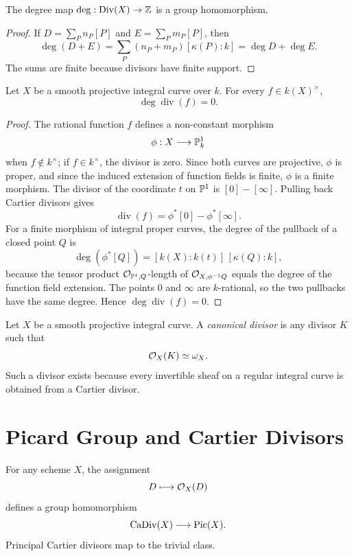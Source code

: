 \begin{proposition}
The degree map \(\deg:\operatorname{Div}(X)\to\mathbb{Z}\) is a group homomorphism.
\end{proposition}

\begin{proof}
If \(D=\sum_P n_P[P]\) and \(E=\sum_P m_P[P]\), then
\[
    \deg(D+E)
    =
    \sum_P (n_P+m_P)[\kappa(P):k]
    =
    \deg D+\deg E.
\]
The sums are finite because divisors have finite support.
\end{proof}

\begin{theorem}
Let \(X\) be a smooth projective integral curve over \(k\).  For every
\(f\in k(X)^\times\),
\[
    \deg\operatorname{div}(f)=0.
\]
\end{theorem}

\begin{proof}
The rational function \(f\) defines a non-constant morphism
\[
    \phi:X\longrightarrow \mathbb{P}^1_k
\]
when \(f\notin k^\times\); if \(f\in k^\times\), the divisor is zero.  Since
both curves are projective, \(\phi\) is proper, and since the induced extension
of function fields is finite, \(\phi\) is a finite morphism.  The divisor of
the coordinate \(t\) on \(\mathbb{P}^1\) is \([0]-[\infty]\).  Pulling back Cartier
divisors gives
\[
    \operatorname{div}(f)=\phi^*[0]-\phi^*[\infty].
\]
For a finite morphism of integral proper curves, the degree of the pullback of
a closed point \(Q\) is
\[
    \deg(\phi^*[Q])
    =
    [k(X):k(t)]\,[\kappa(Q):k],
\]
because the tensor product
\(\mathcal{O}_{\mathbb{P}^1,Q}\)-length of \(\mathcal{O}_{X,\phi^{-1}Q}\) equals the degree of the
function field extension.  The points \(0\) and \(\infty\) are \(k\)-rational,
so the two pullbacks have the same degree.  Hence
\(\deg\operatorname{div}(f)=0\).
\end{proof}

\begin{definition}
Let \(X\) be a smooth projective integral curve.  A \emph{canonical divisor} is
any divisor \(K\) such that
\[
    \mathcal{O}_X(K)\simeq \omega_X.
\]
Such a divisor exists because every invertible sheaf on a regular integral
curve is obtained from a Cartier divisor.
\end{definition}

\section{Picard Group and Cartier Divisors}

\begin{proposition}
For any scheme \(X\), the assignment
\[
    D\longmapsto \mathcal{O}_X(D)
\]
defines a group homomorphism
\[
    \operatorname{CaDiv}(X)\longrightarrow \operatorname{Pic}(X).
\]
Principal Cartier divisors map to the trivial class.
\end{proposition}

